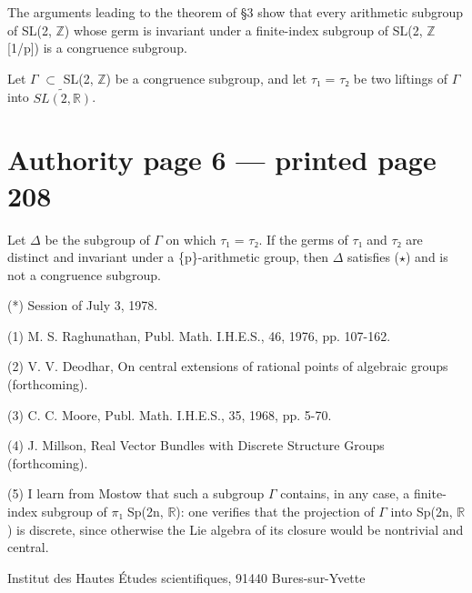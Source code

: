 \documentclass[10pt,a4paper]{article}
\begin{document}
\smallskip
\noindent The arguments leading to the theorem of §3 show that every arithmetic subgroup of SL(2, \ensuremath{ℤ}) whose germ is invariant under a finite-index subgroup of SL(2, \ensuremath{ℤ}[1/p]) is a congruence subgroup.\par
\smallskip
\noindent Let \ensuremath{Γ} \ensuremath{⊂} SL(2, \ensuremath{ℤ}) be a congruence subgroup, and let \ensuremath{τ₁} = \ensuremath{τ₂} be two liftings of \ensuremath{Γ} into \ensuremath{\widetilde{SL(2, ℝ)}}.\par
\clearpage
{}\hypertarget{authority-page-0006}{}
\section*{Authority page 6 --- printed page 208}
\noindent Let \ensuremath{Δ} be the subgroup of \ensuremath{Γ} on which \ensuremath{τ₁} = \ensuremath{τ₂}. If the germs of \ensuremath{τ₁} and \ensuremath{τ₂} are distinct and invariant under a \{p\}-arithmetic group, then \ensuremath{Δ} satisfies (\ensuremath{\star}) and is not a congruence subgroup.\par
\smallskip
\noindent (*) Session of July 3, 1978.\par
\smallskip
\noindent (1) M. S. Raghunathan, Publ. Math. I.H.E.S., 46, 1976, pp. 107-162.\par
\smallskip
\noindent (2) V. V. Deodhar, On central extensions of rational points of algebraic groups (forthcoming).\par
\smallskip
\noindent (3) C. C. Moore, Publ. Math. I.H.E.S., 35, 1968, pp. 5-70.\par
\smallskip
\noindent (4) J. Millson, Real Vector Bundles with Discrete Structure Groups (forthcoming).\par
\smallskip
\noindent (5) I learn from Mostow that such a subgroup \ensuremath{Γ} contains, in any case, a finite-index subgroup of \ensuremath{π₁} Sp(2n, \ensuremath{ℝ}): one verifies that the projection of \ensuremath{Γ} into Sp(2n, \ensuremath{ℝ}) is discrete, since otherwise the Lie algebra of its closure would be nontrivial and central.\par
\smallskip
\noindent Institut des Hautes Études scientifiques, 91440 Bures-sur-Yvette\par
\end{document}
